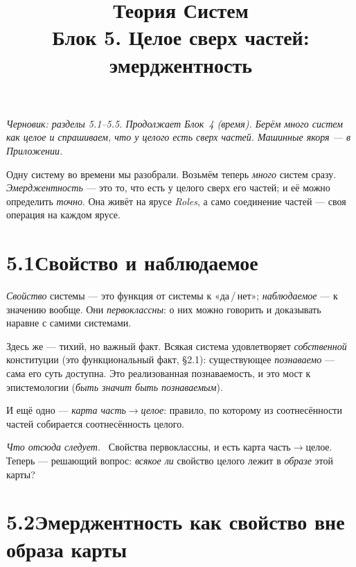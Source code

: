 \documentclass[12pt,a4paper]{article}
\title{\textbf{Теория Систем}\\[2mm]\large Блок 5. Целое сверх частей: эмерджентность}
\author{}
\date{}
\newcommand{\rezultat}{\medskip\noindent\emph{Что отсюда следует.}\ }
\begin{document}
\maketitle
\thispagestyle{empty}

\noindent\small\textit{Черновик: разделы 5.1--5.5. Продолжает Блок~4 (время). Берём \emph{много}
систем как целое и спрашиваем, что у целого есть \emph{сверх} частей. Машинные якоря --- в
Приложении.}\normalsize

\bigskip

\noindent Одну систему во времени мы разобрали. Возьмём теперь \emph{много} систем сразу.
\emph{Эмерджентность} --- это то, что есть у целого сверх его частей; и её можно определить
\emph{точно}. Она живёт на ярусе \emph{Roles}, а само соединение частей --- своя операция на каждом
ярусе.

\section*{5.1\quad Свойство и наблюдаемое}

\emph{Свойство} системы --- это функция от системы к «да\,/\,нет»; \emph{наблюдаемое} --- к значению
вообще. Они \emph{первоклассны}: о них можно говорить и доказывать наравне с самими системами.

Здесь же --- тихий, но важный факт. Всякая система удовлетворяет \emph{собственной} конституции (это
функциональный факт, §2.1): существующее \emph{познаваемо} --- сама его суть доступна. Это реализованная
познаваемость, и это мост к эпистемологии (\emph{быть значит быть познаваемым}).

И ещё одно --- \emph{карта часть$\to$целое}: правило, по которому из соотнесённости частей собирается
соотнесённость целого.

\rezultat
Свойства первоклассны, и есть карта часть$\to$целое. Теперь --- решающий вопрос: \emph{всякое ли}
свойство целого лежит в \emph{образе} этой карты?

\section*{5.2\quad Эмерджентность как свойство вне образа карты}
\end{document}
